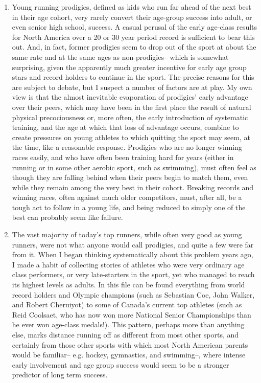 \begin{enumerate}
    \item Young running prodigies, defined as kids who run far ahead of the next best in their age cohort, very rarely convert their age-group success into adult, or even senior high school, success. A casual perusal of the early age-class results for North America over a 20 or 30 year period record is sufficient to bear this out. And, in fact, former prodigies seem to drop out of the sport at about the same rate and at the same ages as non-prodigies-- which is somewhat surprising, given the apparently much greater incentive for early age group stars and record holders to continue in the sport. The precise reasons for this are subject to debate, but I suspect a number of factors are at play. My own view is that the almost inevitable evaporation of prodigies' early advantage over their peers, which may have been in the first place the result of natural physical precociousness or, more often, the early introduction of systematic training, and the age at which that loss of advantage occurs, combine to create pressures on young athletes to which quitting the sport may seem, at the time, like a reasonable response. Prodigies who are no longer winning races easily, and who have often been training hard for years (either in running or in some other aerobic sport, such as swimming), must often feel as though they are falling behind when their peers begin to match them, even while they remain among the very best in their cohort. Breaking records and winning races, often against much older competitors, must, after all, be a tough act to follow in a young life, and being reduced to simply one of the best can probably seem like failure.

    \item The vast majority of today's top runners, while often very good as young runners, were not what anyone would call prodigies, and quite a few were far from it. When I began thinking systematically about this problem years ago, I made a habit of collecting stories of athletes who were very ordinary age class performers, or very late-starters in the sport, yet who managed to reach its highest levels as adults. In this file can be found everything from world record holders and Olympic champions (such as Sebastian Coe, John Walker, and Robert Cheruiyot) to some of Canada's current top athletes (such as Reid Coolsaet, who has now won more National Senior Championships than he ever won age-class medals!). This pattern, perhaps more than anything else, marks distance running off as different from most other sports, and certainly from those other sports with which most North American parents would be familiar-- e.g. hockey, gymnastics, and swimming--, where intense early involvement and age group success would seem to be a stronger predictor of long term success.


\end{enumerate}
